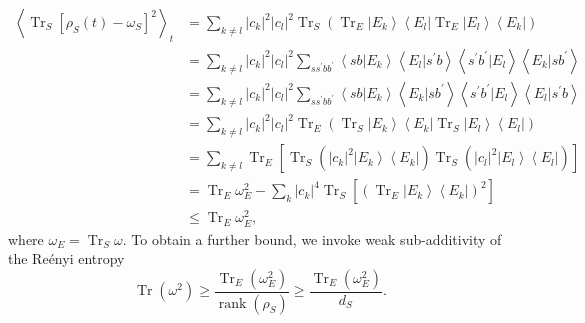 \begin{equation}
\begin{aligned}
\left\langle\operatorname{Tr}_{S}\left[\rho_{S}(t)-\omega_{S}\right]^{2}\right\rangle_{t} &=\sum_{k \neq l}\left|c_{k}\right|^{2}\left|c_{l}\right|^{2} \operatorname{Tr}_{S}\left(\operatorname{Tr}_{E}\left|E_{k}\right\rangle\left\langle E_{l}\left|\operatorname{Tr}_{E}\right| E_{l}\right\rangle\left\langle E_{k}\right|\right) \\
&=\sum_{k \neq l}\left|c_{k}\right|^{2}\left|c_{l}\right|^{2} \sum_{s s^{\prime} b b^{\prime}}\left\langle s b | E_{k}\right\rangle\left\langle E_{l} | s^{\prime} b\right\rangle\left\langle s^{\prime} b^{\prime} | E_{l}\right\rangle\left\langle E_{k} | s b^{\prime}\right\rangle\\
&=\sum_{k \neq l}\left|c_{k}\right|^{2}\left|c_{l}\right|^{2} \sum_{s s^{\prime} b b^{\prime}}\left\langle s b | E_{k}\right\rangle\left\langle E_{k} | s b^{\prime}\right\rangle\left\langle s^{\prime} b^{\prime} | E_{l}\right\rangle\left\langle E_{l} | s^{\prime} b\right\rangle \\
&=\sum_{k \neq l}\left|c_{k}\right|^{2}\left|c_{l}\right|^{2} \operatorname{Tr}_{E}\left(\operatorname{Tr}_{S}\left|E_{k}\right\rangle\left\langle E_{k}\left|\operatorname{Tr}_{S}\right| E_{l}\right\rangle\left\langle E_{l}\right|\right)\\
&=\sum_{k \neq l} \operatorname{Tr}_{E}\left[\operatorname{Tr}_{S}\left(\left|c_{k}\right|^{2}\left|E_{k}\right\rangle\left\langle E_{k}\right|\right) \operatorname{Tr}_{S}\left(\left|c_{l}\right|^{2}\left|E_{l}\right\rangle\left\langle E_{l}\right|\right)\right] \\
&=\operatorname{Tr}_{E} \omega_{E}^{2}-\sum_{k}\left|c_{k}\right|^{4} \operatorname{Tr}_{S}\left[\left(\operatorname{Tr}_{E}\left|E_{k}\right\rangle\left\langle E_{k}\right|\right)^{2}\right] \\
&\leq \operatorname{Tr}_{E} \omega_{E}^{2},
\end{aligned}
\label{CH1:Linden_proof_3}
\end{equation}
where $\omega_E=\operatorname{Tr}_S \omega$. To obtain a further bound, we invoke weak sub-additivity of the Re\'enyi entropy \cite{camilo_strong_2019}
\begin{equation}
\operatorname{Tr}\left(\omega^{2}\right) \geq \frac{\operatorname{Tr}_{E}\left(\omega_{E}^{2}\right)}{\operatorname{rank}\left(\rho_{S}\right)} \geq \frac{\operatorname{Tr}_{E}\left(\omega_{E}^{2}\right)}{d_{S}}.
\label{CH1:Linden_proof_4}
\end{equation}
